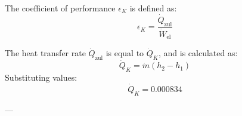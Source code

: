 The coefficient of performance \( \epsilon_K \) is defined as:  
\[
\epsilon_K = \frac{\dot{Q}_{\text{zul}}}{\dot{W}_{\text{el}}}
\]  

The heat transfer rate \( \dot{Q}_{\text{zul}} \) is equal to \( \dot{Q}_K \), and is calculated as:  
\[
\dot{Q}_K = \dot{m}(h_2 - h_1)
\]  
Substituting values:  
\[
\dot{Q}_K = 0.000834
\]  

---